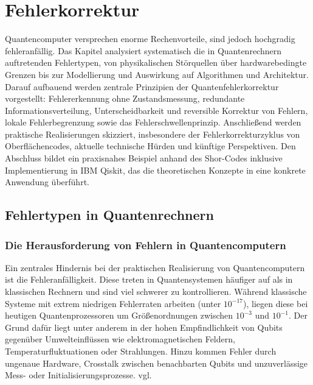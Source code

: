 \chapter{Fehlerkorrektur}
\label{error_correction} %


\abstract{}Quantencomputer versprechen enorme Rechenvorteile, sind jedoch hochgradig fehleranfällig. Das Kapitel analysiert systematisch die in Quantenrechnern auftretenden Fehlertypen, von physikalischen Störquellen über hardwarebedingte Grenzen bis zur Modellierung und Auswirkung auf Algorithmen und Architektur. Darauf aufbauend werden zentrale Prinzipien der Quantenfehlerkorrektur vorgestellt: Fehlererkennung ohne Zustandsmessung, redundante Informationsverteilung, Unterscheidbarkeit und reversible Korrektur von Fehlern, lokale Fehlerbegrenzung sowie das Fehlerschwellenprinzip. Anschließend werden praktische Realisierungen skizziert, insbesondere der Fehlerkorrekturzyklus von Oberflächencodes, aktuelle technische Hürden und künftige Perspektiven. Den Abschluss bildet ein praxisnahes Beispiel anhand des Shor-Codes inklusive Implementierung in IBM Qiskit, das die theoretischen Konzepte in eine konkrete Anwendung überführt.

\section{Fehlertypen in Quantenrechnern}\label{chap:QEC1}
\subsection{Die Herausforderung von Fehlern in Quantencomputern}
 Ein zentrales Hindernis bei der praktischen Realisierung von Quantencomputern ist die Fehleranfälligkeit. Diese treten in Quantensystemen häufiger auf als in klassischen Rechnern und sind viel schwerer zu kontrollieren.
Während klassische Systeme mit extrem niedrigen Fehlerraten arbeiten (unter $10^{-17}$), liegen diese bei heutigen Quantenprozessoren um Größenordnungen zwischen $10^{-3}$ und $10^{-1}$. Der Grund dafür liegt unter anderem in der hohen Empfindlichkeit von Qubits gegenüber Umwelteinflüssen wie elektromagnetischen Feldern, Temperaturfluktuationen oder Strahlungen. Hinzu kommen Fehler durch ungenaue Hardware, Crosstalk zwischen benachbarten Qubits und unzuverlässige Mess- oder Initialisierungsprozesse. vgl.\cite[Seite 48-49]{tutschke_quantencomputing_2023}\medskip

